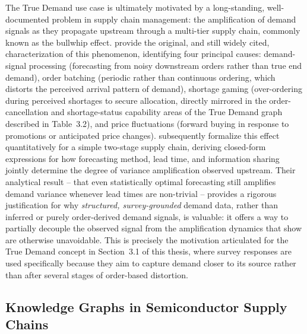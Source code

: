 \documentclass[
  12pt,
  english,
  oneside]{report}
\begin{document}
The True Demand use case is ultimately motivated by a long-standing,
well-documented problem in supply chain management: the amplification of
demand signals as they propagate upstream through a multi-tier supply
chain, commonly known as the bullwhip effect. \citet{lee1997bullwhip}
provide the original, and still widely cited, characterization of this
phenomenon, identifying four principal causes: demand-signal processing
(forecasting from noisy downstream orders rather than true end demand),
order batching (periodic rather than continuous ordering, which distorts
the perceived arrival pattern of demand), shortage gaming (over-ordering
during perceived shortages to secure allocation, directly mirrored in the
order-cancellation and shortage-status capability areas of the True Demand
graph described in Table~3.2), and price fluctuations (forward buying in
response to promotions or anticipated price changes). \citet{chen2000quantifying}
subsequently formalize this effect quantitatively for a simple two-stage
supply chain, deriving closed-form expressions for how forecasting method,
lead time, and information sharing jointly determine the degree of
variance amplification observed upstream. Their analytical result --
that even statistically optimal forecasting still amplifies demand
variance whenever lead times are non-trivial -- provides a rigorous
justification for why \emph{structured, survey-grounded} demand data,
rather than inferred or purely order-derived demand signals, is valuable:
it offers a way to partially decouple the observed signal from the
amplification dynamics that \citet{chen2000quantifying} show are otherwise
unavoidable. This is precisely the motivation articulated for the True
Demand concept in Section~3.1 of this thesis, where survey responses are
used specifically because they aim to capture demand closer to its source
rather than after several stages of order-based distortion.

\subsection{Knowledge Graphs in Semiconductor Supply Chains}
\end{document}
